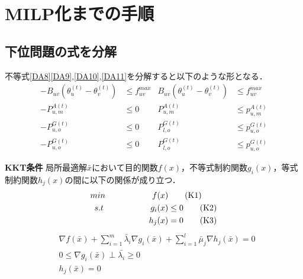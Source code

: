 \documentclass[a4j,10.5pt]{jarticle}
\begin{document}
\section{MILP化までの手順}
\subsection{下位問題の式を分解}
不等式\ref{DA8}\ref{DA9},\ref{DA10},\ref{DA11}を分解すると以下のような形となる．
\begin{align}
-B_{uv}(\theta_u^{(t)}-\theta_v^{(t)})&\le f_{uv}^{max}&B_{uv}(\theta_u^{(t)}-\theta_v^{(t)})&\le f_{uv}^{max}\label{1}\\
-P_{u,m}^{A(t)}&\le 0&P_{u,m}^{A(t)}&\le p_{u,m}^{A(t)}\label{2}\\
-P_{u,o}^{G(t)}&\le 0&P_{l,o}^{G(t)}&\le p_{u,o}^{G(t)}\label{3}\\
-P_{u,o}^{G(t)}&\le 0&P_{l,o}^{G(t)}&\le p_{u,o}^{G(t)}\label{4}
\end{align}

\begin{itembox}[l]{\bf{KKT条件}}
	局所最適解$\bar{x}$において目的関数$f(x)$，不等式制約関数$g_i(x)$，等式制約関数$h_j(x)$の間に以下の関係が成り立つ．\\
	\begin{align}
	min\hspace{20mm}f(x)&\label{K1}\tag{K1}\\
	s.t \hspace{20mm}g_i(x)&\le 0\label{K2}\tag{K2}\\
	h_j(x)&=0\label{K3}\tag{K3}
	\end{align}
	\begin{align}
	&\nabla f(\bar{x})+ \sum_{i=1}^m \bar{\lambda}_i \nabla g_i(\bar{x}) + \sum_{i=1}^l \bar{\mu}_j \nabla h_j(\bar{x})=0\label{K4}\tag{K4}\\
	&0\le\nabla g_i(\bar{x})\perp\bar{\lambda_i}\geq0\label{K5}\tag{K5}\\
	&h_j(\bar{x})=0\label{K6}\tag{K6}
	\end{align}
\end{itembox}
\end{document}
